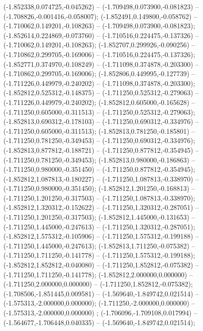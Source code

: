  (-1.852338,0.074725,-0.045262) -- (-1.709498,0.073900,-0.081823) -- (-1.708826,-0.001416,-0.058007);
 (-1.852491,0.149800,-0.058762) -- (-1.710062,0.149201,-0.108263) -- (-1.709498,0.073900,-0.081823);
 (-1.852614,0.224869,-0.073760) -- (-1.710516,0.224475,-0.137326) -- (-1.710062,0.149201,-0.108263);
 (-1.852707,0.299926,-0.090256) -- (-1.710862,0.299705,-0.169006) -- (-1.710516,0.224475,-0.137326);
 (-1.852771,0.374970,-0.108249) -- (-1.711098,0.374878,-0.203300) -- (-1.710862,0.299705,-0.169006);
 (-1.852806,0.449995,-0.127739) -- (-1.711226,0.449979,-0.240202) -- (-1.711098,0.374878,-0.203300);
 (-1.852812,0.525312,-0.148375) -- (-1.711250,0.525312,-0.279063) -- (-1.711226,0.449979,-0.240202);
 (-1.852812,0.605000,-0.165628) -- (-1.711250,0.605000,-0.311513) -- (-1.711250,0.525312,-0.279063);
 (-1.852813,0.690312,-0.178103) -- (-1.711250,0.690312,-0.334976) -- (-1.711250,0.605000,-0.311513);
 (-1.852813,0.781250,-0.185801) -- (-1.711250,0.781250,-0.349453) -- (-1.711250,0.690312,-0.334976);
 (-1.852813,0.877812,-0.188721) -- (-1.711250,0.877812,-0.354945) -- (-1.711250,0.781250,-0.349453);
 (-1.852813,0.980000,-0.186863) -- (-1.711250,0.980000,-0.351450) -- (-1.711250,0.877812,-0.354945);
 (-1.852812,1.087813,-0.180227) -- (-1.711250,1.087813,-0.338970) -- (-1.711250,0.980000,-0.351450);
 (-1.852812,1.201250,-0.168813) -- (-1.711250,1.201250,-0.317503) -- (-1.711250,1.087813,-0.338970);
 (-1.852812,1.320312,-0.152622) -- (-1.711250,1.320312,-0.287051) -- (-1.711250,1.201250,-0.317503);
 (-1.852812,1.445000,-0.131653) -- (-1.711250,1.445000,-0.247613) -- (-1.711250,1.320312,-0.287051);
 (-1.852812,1.575312,-0.105906) -- (-1.711250,1.575312,-0.199188) -- (-1.711250,1.445000,-0.247613);
 (-1.852813,1.711250,-0.075382) -- (-1.711250,1.711250,-0.141778) -- (-1.711250,1.575312,-0.199188);
 (-1.852812,1.852812,-0.040080) -- (-1.711250,1.852812,-0.075382) -- (-1.711250,1.711250,-0.141778);
 (-1.852812,2.000000,0.000000) -- (-1.711250,2.000000,0.000000) -- (-1.711250,1.852812,-0.075382);
 (-1.708506,-1.851445,0.009581) -- (-1.569640,-1.849742,0.021514) -- (-1.575313,-2.000000,0.000000);
 (-1.711250,-2.000000,0.000000) -- (-1.575313,-2.000000,0.000000) ;
 (-1.706096,-1.709108,0.017994) -- (-1.564677,-1.706448,0.040335) -- (-1.569640,-1.849742,0.021514);
